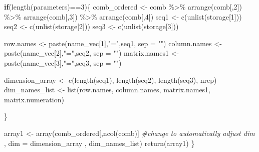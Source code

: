 \documentclass[11pt,a4paper]{article}
\newenvironment{Shaded}{\begin{snugshade}}{\end{snugshade}}
\newcommand{\AttributeTok}[1]{\textcolor[rgb]{0.77,0.63,0.00}{#1}}
\newcommand{\CommentTok}[1]{\textcolor[rgb]{0.56,0.35,0.01}{\textit{#1}}}
\newcommand{\ControlFlowTok}[1]{\textcolor[rgb]{0.13,0.29,0.53}{\textbf{#1}}}
\newcommand{\DecValTok}[1]{\textcolor[rgb]{0.00,0.00,0.81}{#1}}
\newcommand{\FunctionTok}[1]{\textcolor[rgb]{0.00,0.00,0.00}{#1}}
\newcommand{\NormalTok}[1]{#1}
\newcommand{\OtherTok}[1]{\textcolor[rgb]{0.56,0.35,0.01}{#1}}
\newcommand{\SpecialCharTok}[1]{\textcolor[rgb]{0.00,0.00,0.00}{#1}}
\newcommand{\StringTok}[1]{\textcolor[rgb]{0.31,0.60,0.02}{#1}}
\begin{document}
\begin{Shaded}
\begin{Highlighting}[]
  \ControlFlowTok{if}\NormalTok{(}\FunctionTok{length}\NormalTok{(parameters)}\SpecialCharTok{==}\DecValTok{3}\NormalTok{)\{}
\NormalTok{    comb\_ordered }\OtherTok{\textless{}{-}}\NormalTok{  comb }\SpecialCharTok{\%\textgreater{}\%} \FunctionTok{arrange}\NormalTok{(comb[,}\DecValTok{2}\NormalTok{])  }\SpecialCharTok{\%\textgreater{}\%} 
      \FunctionTok{arrange}\NormalTok{(comb[,}\DecValTok{3}\NormalTok{]) }\SpecialCharTok{\%\textgreater{}\%} \FunctionTok{arrange}\NormalTok{(comb[,}\DecValTok{4}\NormalTok{]) }
\NormalTok{    seq1 }\OtherTok{\textless{}{-}} \FunctionTok{c}\NormalTok{(}\FunctionTok{unlist}\NormalTok{(storage[}\DecValTok{1}\NormalTok{]))}
\NormalTok{    seq2 }\OtherTok{\textless{}{-}} \FunctionTok{c}\NormalTok{(}\FunctionTok{unlist}\NormalTok{(storage[}\DecValTok{2}\NormalTok{]))}
\NormalTok{    seq3 }\OtherTok{\textless{}{-}} \FunctionTok{c}\NormalTok{(}\FunctionTok{unlist}\NormalTok{(storage[}\DecValTok{3}\NormalTok{]))}
    
\NormalTok{    row.names }\OtherTok{\textless{}{-}} \FunctionTok{paste}\NormalTok{(name\_vec[}\DecValTok{1}\NormalTok{],}\StringTok{"="}\NormalTok{,seq1, }\AttributeTok{sep =} \StringTok{""}\NormalTok{)}
\NormalTok{    column.names }\OtherTok{\textless{}{-}}  \FunctionTok{paste}\NormalTok{(name\_vec[}\DecValTok{2}\NormalTok{],}\StringTok{"="}\NormalTok{,seq2, }\AttributeTok{sep =} \StringTok{""}\NormalTok{)}
\NormalTok{    matrix.names1 }\OtherTok{\textless{}{-}}  \FunctionTok{paste}\NormalTok{(name\_vec[}\DecValTok{3}\NormalTok{],}\StringTok{"="}\NormalTok{,seq3, }\AttributeTok{sep =} \StringTok{""}\NormalTok{)}
    
\NormalTok{    dimension\_array }\OtherTok{\textless{}{-}} \FunctionTok{c}\NormalTok{(}\FunctionTok{length}\NormalTok{(seq1), }\FunctionTok{length}\NormalTok{(seq2), }\FunctionTok{length}\NormalTok{(seq3), nrep)}
\NormalTok{    dim\_names\_list }\OtherTok{\textless{}{-}} \FunctionTok{list}\NormalTok{(row.names, column.names, }
\NormalTok{                           matrix.names1, matrix.numeration)}
    
\NormalTok{  \}}
  
  
\NormalTok{  array1 }\OtherTok{\textless{}{-}} \FunctionTok{array}\NormalTok{(comb\_ordered[,}\FunctionTok{ncol}\NormalTok{(comb)] }
                  \CommentTok{\#change to automatically adjust dim}
\NormalTok{                  , }\AttributeTok{dim =}\NormalTok{ dimension\_array}
\NormalTok{                  , dim\_names\_list)}
  \FunctionTok{return}\NormalTok{(array1)}
\NormalTok{\}}
\end{Highlighting}
\end{Shaded}
\end{document}
